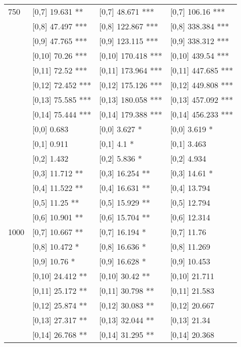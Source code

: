 \begin{table}
\begin{tabular}[t]{llll}
750 & {}[0,7] 19.631 ** & {}[0,7] 48.671 *** & {}[0,7] 106.16 ***\\
 & {}[0,8] 47.497 *** & {}[0,8] 122.867 *** & {}[0,8] 338.384 ***\\
 & {}[0,9] 47.765 *** & {}[0,9] 123.115 *** & {}[0,9] 338.312 ***\\
\addlinespace
 & {}[0,10] 70.26 *** & {}[0,10] 170.418 *** & {}[0,10] 439.54 ***\\
 & {}[0,11] 72.52 *** & {}[0,11] 173.964 *** & {}[0,11] 447.685 ***\\
 & {}[0,12] 72.452 *** & {}[0,12] 175.126 *** & {}[0,12] 449.808 ***\\
 & {}[0,13] 75.585 *** & {}[0,13] 180.058 *** & {}[0,13] 457.092 ***\\
 & {}[0,14] 75.444 *** & {}[0,14] 179.388 *** & {}[0,14] 456.233 ***\\
\addlinespace
 & {}[0,0] 0.683 & {}[0,0] 3.627 * & {}[0,0] 3.619 *\\
 & {}[0,1] 0.911 & {}[0,1] 4.1 * & {}[0,1] 3.463\\
 & {}[0,2] 1.432 & {}[0,2] 5.836 * & {}[0,2] 4.934\\
 & {}[0,3] 11.712 ** & {}[0,3] 16.254 ** & {}[0,3] 14.61 *\\
 & {}[0,4] 11.522 ** & {}[0,4] 16.631 ** & {}[0,4] 13.794\\
\addlinespace
 & {}[0,5] 11.25 ** & {}[0,5] 15.929 ** & {}[0,5] 12.794\\
 & {}[0,6] 10.901 ** & {}[0,6] 15.704 ** & {}[0,6] 12.314\\
1000 & {}[0,7] 10.667 ** & {}[0,7] 16.194 * & {}[0,7] 11.76\\
 & {}[0,8] 10.472 * & {}[0,8] 16.636 * & {}[0,8] 11.269\\
 & {}[0,9] 10.76 * & {}[0,9] 16.628 * & {}[0,9] 10.453\\
\addlinespace
 & {}[0,10] 24.412 ** & {}[0,10] 30.42 ** & {}[0,10] 21.711\\
 & {}[0,11] 25.172 ** & {}[0,11] 30.798 ** & {}[0,11] 21.583\\
 & {}[0,12] 25.874 ** & {}[0,12] 30.083 ** & {}[0,12] 20.667\\
 & {}[0,13] 27.317 ** & {}[0,13] 32.044 ** & {}[0,13] 21.34\\
 & {}[0,14] 26.768 ** & {}[0,14] 31.295 ** & {}[0,14] 20.368\\
\bottomrule
\end{tabular}
\end{table}
